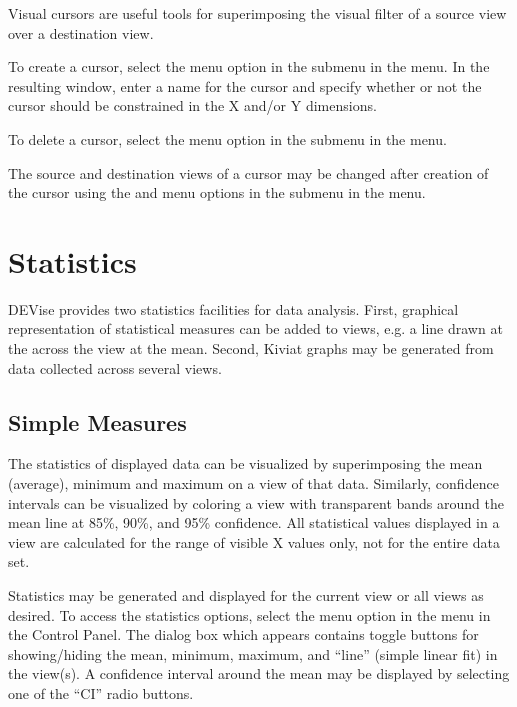 
Visual cursors are useful tools for superimposing the visual filter of a source
view over a destination view.

To create a cursor, select the  menu option in the 
submenu in the  menu. In the resulting window, enter a name for the
cursor and specify whether or not the cursor should be constrained in the X
and/or Y dimensions.

To delete a cursor, select the  menu option in the 
submenu in the  menu. 

The source and destination views of a cursor may be changed after creation of
the cursor using the  and  menu options
in the  submenu in the  menu.


\section{Statistics}

DEVise provides two statistics facilities for data analysis. First, graphical
representation of statistical measures can be added to views, e.g. a line drawn
at the across the view at the mean. Second, Kiviat graphs may be generated from
data collected across several views.


\subsection{Simple Measures}

The statistics of displayed data can be visualized by superimposing the mean
(average), minimum and maximum on a view of that data. Similarly, confidence
intervals can be visualized by coloring a view with transparent bands around the
mean line at 85\%, 90\%, and 95\% confidence. All statistical values displayed
in a view are calculated for the range of visible X values only, not for the
entire data set.

Statistics may be generated and displayed for the current view or all views as
desired. To access the statistics options, select the  menu
option in the  menu in the Control Panel. The dialog box which
appears contains toggle buttons for showing/hiding the mean, minimum, maximum,
and ``line'' (simple linear fit) in the view(s). A confidence interval around
the mean may be displayed by selecting one of the ``CI'' radio buttons.

